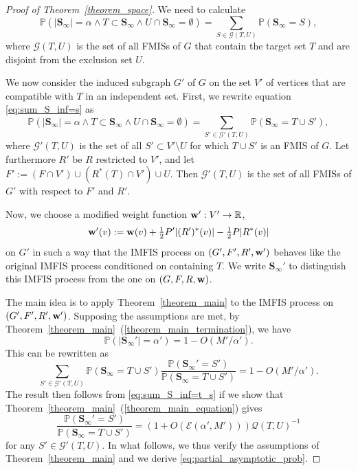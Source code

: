 \documentclass{article}
\theoremstyle{plain}
\theoremstyle{remark}
\theoremstyle{plain}
\numberwithin{equation}{section}
\renewcommand{\b}{{\bf{w}}}
\newcommand{\PP}{\mathbb{P}}
\begin{document}
	\begin{proof}[Proof of Theorem~\ref{theorem_space}]
		We need to calculate
		\begin{equation}\label{eq:sum_S_inf=s}
			\mathbb{P}(|\boldsymbol{S}_{\infty}|=\alpha\wedge T\subset\boldsymbol{S}_{\infty}\wedge U\cap\boldsymbol{S}_{\infty}=\emptyset)=\sum_{S\in\mathcal{G}(T,U)}\mathbb{P}(\boldsymbol{S}_{\infty}=S),
		\end{equation}
		where $\mathcal{G}(T,U)$ is the set of all FMISs of $G$ that contain the target set $T$ and are disjoint from the exclusion set $U$.
		
		We now consider the induced subgraph $G'$ of $G$ on the set $V'$ of vertices that are compatible with $T$ in an independent set. First, we rewrite equation \eqref{eq:sum_S_inf=s} as
		\begin{equation}\label{eq:sum_S_inf=t_s}
			\mathbb{P}(|\boldsymbol{S}_{\infty}|=\alpha\wedge T\subset\boldsymbol{S}_{\infty}\wedge U\cap\boldsymbol{S}_{\infty}=\emptyset)=\sum_{S'\in\mathcal{G}'(T,U)}\mathbb{P}(\boldsymbol{S}_{\infty}=T\cup S'),
		\end{equation}
		where $\mathcal{G}'(T,U)$ is the set of all $S'\subset V'\setminus U$ for which $T\cup S'$ is an FMIS of $G$. Let furthermore $R'$ be $R$ restricted to $V'$, and let $F':=(F\cap V')\cup(R^*(T)\cap V')\cup U$. Then $\mathcal{G}'(T,U)$ is the set of all FMISs of $G'$ with respect to $F'$ and $R'$.
		
		Now, we choose a modified weight function $\b':V'\to\mathbb{R}$, $$\b'(v):=\b(v)+\tfrac12P'|(R')^*(v)|-\tfrac12P|R^*(v)|$$ on $G'$ in such a way that the IMFIS process on $(G',F',R',\b')$ behaves like the original IMFIS process conditioned on containing $T$. We write $\boldsymbol{S}_{\infty}'$ to distinguish this IMFIS process from the one on $(G,F,R,\b)$.
		
		The main idea is to apply Theorem~\ref{theorem_main} to the IMFIS process on $(G',F',R',\b')$. Supposing the assumptions are met, by Theorem~\ref{theorem_main}~(\ref{theorem_main_termination}), we have $$\PP(|\boldsymbol{S}_{\infty}'| = \alpha') = 1-O(M'/\alpha').$$ This can be rewritten as $$\sum_{S'\in\mathcal{G}'(T,U)}\mathbb{P}(\boldsymbol{S}_{\infty}=T\cup S')\frac{\mathbb{P}(\boldsymbol{S}_{\infty}'=S')}{\mathbb{P}(\boldsymbol{S}_{\infty}=T\cup S')} = 1-O(M'/\alpha').$$ The result then follows from \eqref{eq:sum_S_inf=t_s} if we show that Theorem~\ref{theorem_main}~(\ref{theorem_main_equation}) gives
		\begin{equation}\label{eq:partial_asymptotic_prob}
			\frac{\mathbb{P}(\boldsymbol{S}_{\infty}'=S')}{\mathbb{P}(\boldsymbol{S}_{\infty}=T\cup S')}=(1+O(\mathscr{E}(\alpha',M')))\mathscr{Q}(T,U)^{-1}
		\end{equation}
		for any $S'\in\mathcal{G}'(T,U)$. In what follows, we thus verify the assumptions of Theorem~\ref{theorem_main} and we derive \eqref{eq:partial_asymptotic_prob}.
		

\end{proof}
\end{document}
